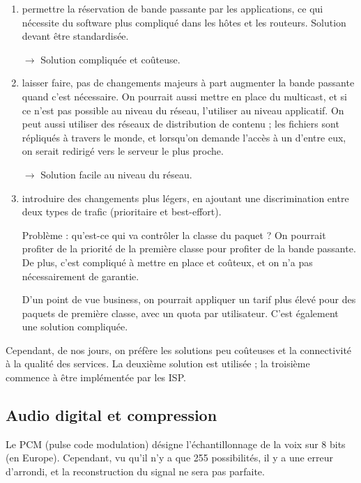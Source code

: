 \documentclass[10pt,a4paper]{report}
\begin{document}
			\begin{enumerate}
				\item permettre la réservation de bande passante par les applications, ce qui nécessite du software plus compliqué dans les hôtes et les routeurs. Solution devant être standardisée.
			
				$\rightarrow$ Solution compliquée et coûteuse.
			
				\item laisser faire, pas de changements majeurs à part augmenter la bande passante quand c'est nécessaire. On pourrait aussi mettre en place du multicast, et si ce n'est pas possible au niveau du réseau, l'utiliser au niveau applicatif. On peut aussi utiliser des réseaux de distribution de contenu ; les fichiers sont répliqués à travers le monde, et lorsqu'on demande l'accès à un d'entre eux, on serait redirigé vers le serveur le plus proche.
			
				$\rightarrow$ Solution facile au niveau du réseau.
			
				\item introduire des changements plus légers, en ajoutant une discrimination entre deux types de trafic (prioritaire et best-effort).
			
				Problème : qu'est-ce qui va contrôler la classe du paquet ? On pourrait profiter de la priorité de la première classe pour profiter de la bande passante. De plus, c'est compliqué à mettre en place et coûteux, et on n'a pas nécessairement de garantie.
			
				D'un point de vue business, on pourrait appliquer un tarif plus élevé pour des paquets de première classe, avec un quota par utilisateur. C'est également une solution compliquée.
			
			\end{enumerate}
		
			Cependant, de nos jours, on préfère les solutions peu coûteuses et la connectivité à la qualité des services. La deuxième solution est utilisée ; la troisième commence à être implémentée par les ISP.
		
		
		\subsection{Audio digital et compression}
		
		Le PCM (pulse code modulation) désigne l'échantillonnage de la voix sur 8 bits (en Europe). Cependant, vu qu'il n'y a que 255 possibilités, il y a une erreur d'arrondi, et la reconstruction du signal ne sera pas parfaite.
		
\end{document}
